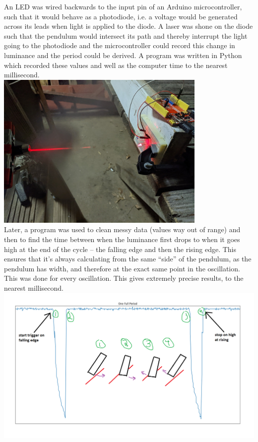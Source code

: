 \documentclass[12pt]{article}
\begin{document}
\begin{enumerate}[label=(\alph*)]
        An LED was wired backwards to the input pin of an Arduino microcontroller, such that it would behave as a photodiode, i.e. a voltage would be generated across its leads when light is applied to the diode. A laser was shone on the diode such that the pendulum would intersect its path and thereby interrupt the light going to the photodiode and the microcontroller could record this change in luminance and the period could be derived. A program was written in Python which recorded these values and well as the computer time to the nearest millisecond.\\
        \includegraphics[width=4in]{las.jpg}\\

        Later, a program was used to clean messy data (values way out of range) and then to find the time between when the luminance first drops to when it goes high at the end of the cycle -- the falling edge and then the rising edge. This ensures that it's always calculating from the same ``side'' of the pendulum, as the pendulum has width, and therefore at the exact same point in the oscillation. This was done for every oscillation. This gives extremely precise results, to the nearest millisecond.
        \includegraphics[width=6in]{period.png}\\


\end{enumerate}
\end{document}
